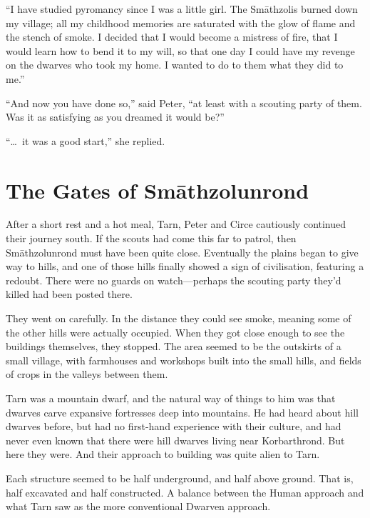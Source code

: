 ``I have studied pyromancy since I was a little girl.  The Sm\=athzolis burned down my village; all my childhood memories are saturated with the glow of flame and the stench of smoke.  I decided that I would become a mistress of fire, that I would learn how to bend it to my will, so that one day I could have my revenge on the dwarves who took my home.  I wanted to do to them what they did to me.''

``And now you have done so,'' said Peter, ``at least with a scouting party of them.  Was it as satisfying as you dreamed it would be?''

``\ldots\ it was a good start,'' she replied.



\chapter{The Gates of Sm\=athzolunrond}

After a short rest and a hot meal, Tarn, Peter and Circe cautiously continued their journey south.  If the scouts had come this far to patrol, then Sm\=athzolunrond must have been quite close.  Eventually the plains began to give way to hills, and one of those hills finally showed a sign of civilisation, featuring a redoubt.  There were no guards on watch---perhaps the scouting party they'd killed had been posted there.

They went on carefully.  In the distance they could see smoke, meaning some of the other hills were actually occupied.  When they got close enough to see the buildings themselves, they stopped.  The area seemed to be the outskirts of a small village, with farmhouses and workshops built into the small hills, and fields of crops in the valleys between them.

Tarn was a mountain dwarf, and the natural way of things to him was that dwarves carve expansive fortresses deep into mountains.  He had heard about hill dwarves before, but had no first-hand experience with their culture, and had never even known that there were hill dwarves living near Korbarthrond.  But here they were.  And their approach to building was quite alien to Tarn.

Each structure seemed to be half underground, and half above ground.  That is, half excavated and half constructed.  A balance between the Human approach and what Tarn saw as the more conventional Dwarven approach.

